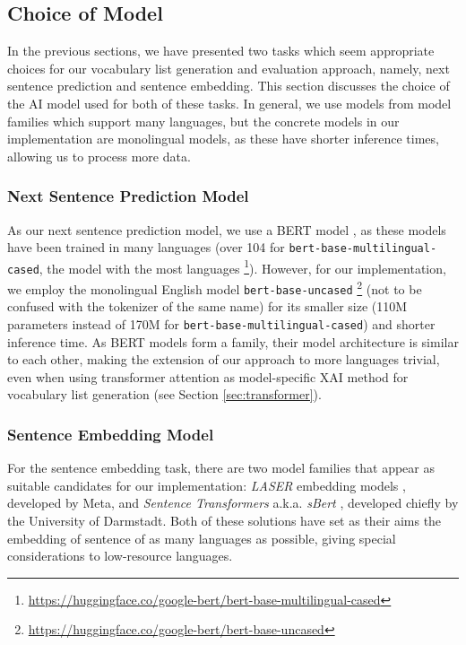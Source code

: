 \subsection{Choice of Model}
In the previous sections, we have presented two tasks which seem appropriate choices for our vocabulary list generation and evaluation approach, namely, next sentence prediction and sentence embedding.
This section discusses the choice of the AI model used for both of these tasks.
In general, we use models from model families which support many languages, but the concrete models in our implementation are monolingual models, as these have shorter inference times, allowing us to process more data.

\subsubsection{Next Sentence Prediction Model}
As our next sentence prediction model, we use a BERT model \cite{kentonBertPretrainingDeep2019}, as these models have been trained in many languages (over 104 for \texttt{bert-base-multilingual-cased}, the model with the most languages \footnote{\url{https://huggingface.co/google-bert/bert-base-multilingual-cased}}).
However, for our implementation, we employ the monolingual English model \texttt{bert-base-uncased} \footnote{\url{https://huggingface.co/google-bert/bert-base-uncased}} (not to be confused with the tokenizer of the same name) for its smaller size (110M parameters instead of 170M for \texttt{bert-base-multilingual-cased}) and shorter inference time.
As BERT models form a family, their model architecture is similar to each other, making the extension of our approach to more languages trivial, even when using transformer attention as model-specific XAI method for vocabulary list generation (see Section \ref{sec:transformer}).


\subsubsection{Sentence Embedding Model}
For the sentence embedding task, there are two model families that appear as suitable candidates for our implementation:
\textit{LASER} embedding models \cite{artetxeMassivelyMultilingualSentence2019}, developed by Meta, and \textit{Sentence Transformers} a.k.a. \textit{sBert} \cite{reimersMakingMonolingualSentence2020}, developed chiefly by the University of Darmstadt.
Both of these solutions have set as their aims the embedding of sentence of as many languages as possible, giving special considerations to low-resource languages.

